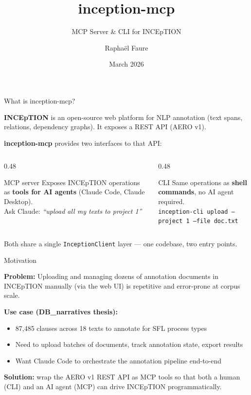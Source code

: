 \documentclass[aspectratio=169, 10pt]{beamer}
\title{inception-mcp}
\subtitle{MCP Server \& CLI for INCEpTION}
\author{Raphaël Faure}
\date{March 2026}
\institute{\url{https://github.com/RaphFaure/inception-mcp}}
\begin{document}
\maketitle

\begin{frame}{What is inception-mcp?}

  \textbf{INCEpTION} is an open-source web platform for NLP annotation
  (text spans, relations, dependency graphs). It exposes a REST API (AERO v1).

  \bigskip
  \textbf{inception-mcp} provides two interfaces to that API:

  \begin{columns}
    \begin{column}{0.48\textwidth}
      \begin{block}{MCP server}
        Exposes INCEpTION operations as \textbf{tools for AI agents}
        (Claude Code, Claude Desktop).\\[4pt]
        \faRobot\; Ask Claude: \textit{``upload all my texts to project 1''}
      \end{block}
    \end{column}
    \begin{column}{0.48\textwidth}
      \begin{block}{CLI}
        Same operations as \textbf{shell commands},
        no AI agent required.\\[4pt]
        \faTerminal\; \texttt{inception-cli upload --project 1 --file doc.txt}
      \end{block}
    \end{column}
  \end{columns}

  \bigskip
  Both share a single \texttt{InceptionClient} layer — one codebase, two entry points.
\end{frame}

\begin{frame}{Motivation}

  \textbf{Problem:} Uploading and managing dozens of annotation documents in INCEpTION
  manually (via the web UI) is repetitive and error-prone at corpus scale.

  \bigskip
  \textbf{Use case (DB\_narratives thesis):}
  \begin{itemize}
    \item 87,485 clauses across 18 texts to annotate for SFL process types
    \item Need to upload batches of documents, track annotation state, export results
    \item Want Claude Code to orchestrate the annotation pipeline end-to-end
  \end{itemize}

  \bigskip
  \textbf{Solution:} wrap the AERO v1 REST API as MCP tools so that both
  a human (CLI) and an AI agent (MCP) can drive INCEpTION programmatically.
\end{frame}
\end{document}
